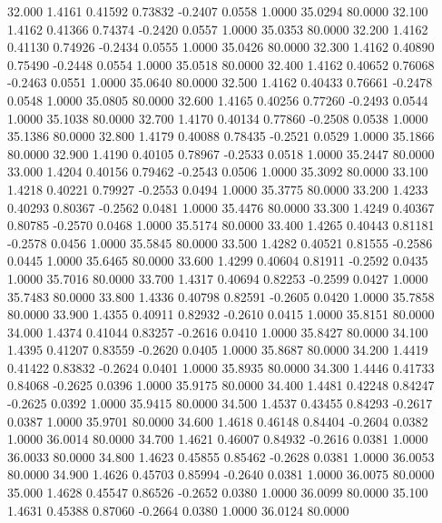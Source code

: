   32.000   1.4161   0.41592   0.73832  -0.2407   0.0558   1.0000  35.0294  80.0000
  32.100   1.4162   0.41366   0.74374  -0.2420   0.0557   1.0000  35.0353  80.0000
  32.200   1.4162   0.41130   0.74926  -0.2434   0.0555   1.0000  35.0426  80.0000
  32.300   1.4162   0.40890   0.75490  -0.2448   0.0554   1.0000  35.0518  80.0000
  32.400   1.4162   0.40652   0.76068  -0.2463   0.0551   1.0000  35.0640  80.0000
  32.500   1.4162   0.40433   0.76661  -0.2478   0.0548   1.0000  35.0805  80.0000
  32.600   1.4165   0.40256   0.77260  -0.2493   0.0544   1.0000  35.1038  80.0000
  32.700   1.4170   0.40134   0.77860  -0.2508   0.0538   1.0000  35.1386  80.0000
  32.800   1.4179   0.40088   0.78435  -0.2521   0.0529   1.0000  35.1866  80.0000
  32.900   1.4190   0.40105   0.78967  -0.2533   0.0518   1.0000  35.2447  80.0000
  33.000   1.4204   0.40156   0.79462  -0.2543   0.0506   1.0000  35.3092  80.0000
  33.100   1.4218   0.40221   0.79927  -0.2553   0.0494   1.0000  35.3775  80.0000
  33.200   1.4233   0.40293   0.80367  -0.2562   0.0481   1.0000  35.4476  80.0000
  33.300   1.4249   0.40367   0.80785  -0.2570   0.0468   1.0000  35.5174  80.0000
  33.400   1.4265   0.40443   0.81181  -0.2578   0.0456   1.0000  35.5845  80.0000
  33.500   1.4282   0.40521   0.81555  -0.2586   0.0445   1.0000  35.6465  80.0000
  33.600   1.4299   0.40604   0.81911  -0.2592   0.0435   1.0000  35.7016  80.0000
  33.700   1.4317   0.40694   0.82253  -0.2599   0.0427   1.0000  35.7483  80.0000
  33.800   1.4336   0.40798   0.82591  -0.2605   0.0420   1.0000  35.7858  80.0000
  33.900   1.4355   0.40911   0.82932  -0.2610   0.0415   1.0000  35.8151  80.0000
  34.000   1.4374   0.41044   0.83257  -0.2616   0.0410   1.0000  35.8427  80.0000
  34.100   1.4395   0.41207   0.83559  -0.2620   0.0405   1.0000  35.8687  80.0000
  34.200   1.4419   0.41422   0.83832  -0.2624   0.0401   1.0000  35.8935  80.0000
  34.300   1.4446   0.41733   0.84068  -0.2625   0.0396   1.0000  35.9175  80.0000
  34.400   1.4481   0.42248   0.84247  -0.2625   0.0392   1.0000  35.9415  80.0000
  34.500   1.4537   0.43455   0.84293  -0.2617   0.0387   1.0000  35.9701  80.0000
  34.600   1.4618   0.46148   0.84404  -0.2604   0.0382   1.0000  36.0014  80.0000
  34.700   1.4621   0.46007   0.84932  -0.2616   0.0381   1.0000  36.0033  80.0000
  34.800   1.4623   0.45855   0.85462  -0.2628   0.0381   1.0000  36.0053  80.0000
  34.900   1.4626   0.45703   0.85994  -0.2640   0.0381   1.0000  36.0075  80.0000
  35.000   1.4628   0.45547   0.86526  -0.2652   0.0380   1.0000  36.0099  80.0000
  35.100   1.4631   0.45388   0.87060  -0.2664   0.0380   1.0000  36.0124  80.0000
